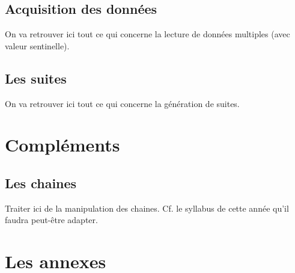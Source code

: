 \documentclass[a4paper,doubleside]{book}
\begin{document}
		\chapter{Acquisition des données}
			\begin{Note}
			On va retrouver ici tout ce qui concerne la lecture
			de données multiples (avec valeur sentinelle).
			\end{Note}
		\chapter{Les suites}
			\begin{Note}
			On va retrouver ici tout ce qui concerne la génération 
			de suites.
			\end{Note}
	
	\part{Compléments}
		\chapter{Les chaines}
			\begin{Note}
			Traiter ici de la manipulation des chaines.
			Cf. le syllabus de cette année
			qu'il faudra peut-être adapter.
			\end{Note}

		

	\appendix
	
	\part{Les annexes}
		
		
	
	
\end{document}
